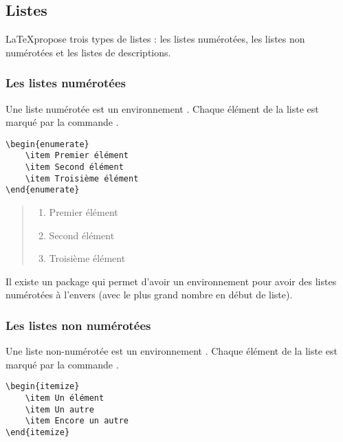 \subsection{Listes}

\LaTeX propose trois types de listes : les listes numérotées, les listes non numérotées et les listes de descriptions.

\subsubsection{Les listes numérotées}

Une liste numérotée est un environnement .
Chaque élément de la liste est marqué par la commande .

\begin{verbatim}
\begin{enumerate}
	\item Premier élément
	\item Second élément
	\item Troisième élément
\end{enumerate}
\end{verbatim}

\begin{quotation}
\begin{enumerate}
	\item Premier élément
	\item Second élément
	\item Troisième élément
\end{enumerate}
\end{quotation}

\begin{anedocte}
Il existe un package  qui permet d'avoir un environnement   pour avoir des listes numérotées à l'envers (avec le plus grand nombre en début de liste).

\end{anedocte}
\subsubsection{Les listes non numérotées}

Une liste non-numérotée est un environnement .
Chaque élément de la liste est marqué par la commande .

\begin{verbatim}
\begin{itemize}
	\item Un élément
	\item Un autre
	\item Encore un autre
\end{itemize}
\end{verbatim}

